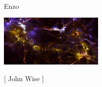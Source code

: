 \begin{frame}[fragile]
\begin{minipage}{3.0in}
\begin{itemize}
\end{itemize}
\vspace{-0.1in}
\end{minipage} \
\begin{minipage}{1.0in}
\vspace{-0.2in}
\centerline{\tiny{Enzo}} 
\vspace{0.1in}
\centerline{\includegraphics[width=2.0in,angle=90]{jhw-dwarf-galaxies.jpg}}
\centerline{\tiny{[ John Wise ]}}
\end{minipage}
\end{frame}

